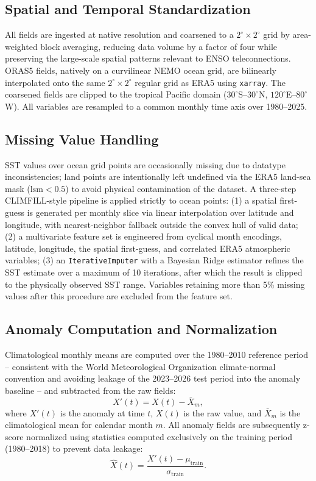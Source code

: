 \documentclass[conference]{IEEEtran}
\begin{document}
\subsection{Spatial and Temporal Standardization}
All fields are ingested at native resolution and coarsened to a $2^{\circ}\times2^{\circ}$ grid by area-weighted block averaging, reducing data volume by a factor of four while preserving the large-scale spatial patterns relevant to ENSO teleconnections. ORAS5 fields, natively on a curvilinear NEMO ocean grid, are bilinearly interpolated onto the same $2^{\circ}\times2^{\circ}$ regular grid as ERA5 using \texttt{xarray}. The coarsened fields are clipped to the tropical Pacific domain ($30^{\circ}$S--$30^{\circ}$N, $120^{\circ}$E--$80^{\circ}$W). All variables are resampled to a common monthly time axis over 1980--2025.

\subsection{Missing Value Handling}
SST values over ocean grid points are occasionally missing due to datatype inconsistencies; land points are intentionally left undefined via the ERA5 land-sea mask ($\mathrm{lsm}<0.5$) to avoid physical contamination of the dataset. A three-step CLIMFILL-style pipeline \cite{bessenbacher2022} is applied strictly to ocean points: (1) a spatial first-guess is generated per monthly slice via linear interpolation over latitude and longitude, with nearest-neighbor fallback outside the convex hull of valid data; (2) a multivariate feature set is engineered from cyclical month encodings, latitude, longitude, the spatial first-guess, and correlated ERA5 atmospheric variables; (3) an \texttt{IterativeImputer} with a Bayesian Ridge estimator refines the SST estimate over a maximum of 10 iterations, after which the result is clipped to the physically observed SST range. Variables retaining more than 5\% missing values after this procedure are excluded from the feature set.

\subsection{Anomaly Computation and Normalization}
Climatological monthly means are computed over the 1980--2010 reference period -- consistent with the World Meteorological Organization climate-normal convention and avoiding leakage of the 2023--2026 test period into the anomaly baseline -- and subtracted from the raw fields:
\begin{equation}
X'(t) = X(t) - \bar{X}_m,
\label{eq:anomaly}
\end{equation}
where $X'(t)$ is the anomaly at time $t$, $X(t)$ is the raw value, and $\bar{X}_m$ is the climatological mean for calendar month $m$. All anomaly fields are subsequently z-score normalized using statistics computed exclusively on the training period (1980--2018) to prevent data leakage:
\begin{equation}
\hat{X}(t) = \frac{X'(t) - \mu_{\text{train}}}{\sigma_{\text{train}}}.
\label{eq:normalize}
\end{equation}
\end{document}
